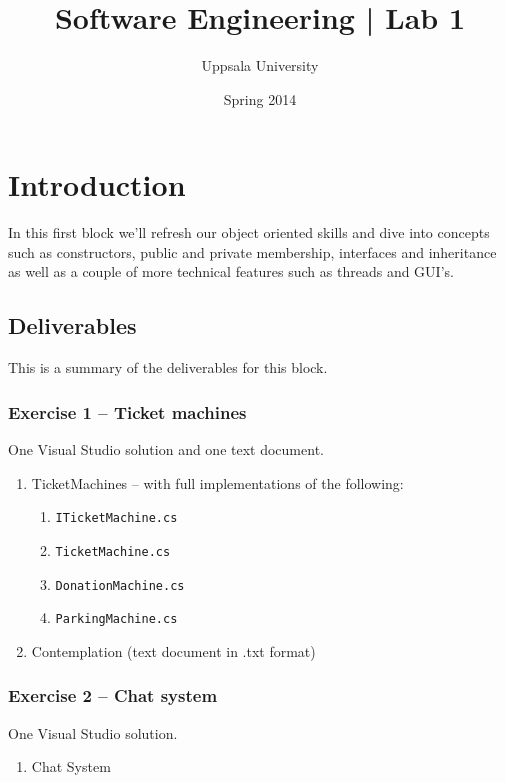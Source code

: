 \documentclass{article}
\begin{document}
  \title{ Software Engineering | Lab 1 }
  \author{ Uppsala University }
  \date{ Spring 2014 }
  \maketitle

  \lstset{language=[Sharp]C}







\section*{Introduction}
In this first block we'll refresh our object oriented skills and dive into concepts such as constructors, public and private membership, interfaces and inheritance as well as a couple of more technical features such as threads and GUI's.

\tableofcontents




\pagebreak
\subsection*{Deliverables}
This is a summary of the deliverables for this block.

\subsubsection*{Exercise 1 -- Ticket machines}
One Visual Studio solution and one text document.
\begin{enumerate}
  \item TicketMachines -- with full implementations of the following:
  \begin{enumerate}
    \item \texttt{ITicketMachine.cs}
    \item \texttt{TicketMachine.cs}
    \item \texttt{DonationMachine.cs}
    \item \texttt{ParkingMachine.cs}
  \end{enumerate}
  \item Contemplation (text document in .txt format)
\end{enumerate}

\subsubsection*{Exercise 2 -- Chat system}
One Visual Studio solution.
\begin{enumerate}
  \item Chat System
\end{enumerate}
\end{document}
